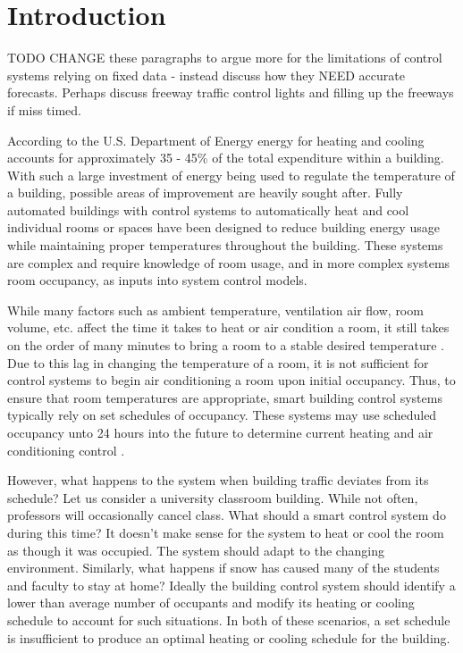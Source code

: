 \chapter{Introduction}
TODO CHANGE these paragraphs to argue more for the limitations of control systems relying on fixed data - instead discuss how they NEED accurate forecasts.  Perhaps discuss freeway traffic control lights and filling up the freeways if miss timed.


According to the U.S. Department of Energy \cite{DOE2010} energy for heating and cooling accounts for approximately 35 - 45\% of the total expenditure within a building.  With such a large investment of energy being used to regulate the temperature of a building, possible areas of improvement are heavily sought after.  Fully automated buildings with control systems to automatically heat and cool individual rooms or spaces have been designed \cite{Controls2013, Controls2013a} to reduce building energy usage while maintaining proper temperatures throughout the building.  These systems are complex and require knowledge of room usage, and in more complex systems room occupancy, as inputs into system control models.
	
While many factors such as ambient temperature, ventilation air flow, room volume, etc. affect the time it takes to heat or air condition a room, it still takes on the order of many minutes to bring a room to a stable desired temperature \cite{yang2004}.  Due to this lag in changing the temperature of a room, it is not sufficient for control systems to begin air conditioning a room upon initial occupancy.   Thus, to ensure that room temperatures are appropriate, smart building control systems typically rely on set schedules of occupancy.  These systems may use scheduled occupancy unto 24 hours into the future to determine current heating and air conditioning control \cite{Ma2010}.  

However, what happens to the system when building traffic deviates from its schedule?  Let us consider a university classroom building.  While not often, professors will occasionally cancel class.  What should a smart control system do during this time?  It doesn't make sense for the system to heat or cool the room as though it was occupied.  The system should adapt to the changing environment.  Similarly, what happens if snow has caused many of the students and faculty to stay at home?  Ideally the building control system should identify a lower than average number of occupants and modify its heating or cooling schedule to account for such situations.  In both of these scenarios, a set schedule is insufficient to produce an optimal heating or cooling schedule for the building.

